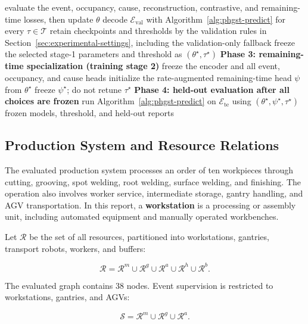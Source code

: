 \begin{algorithm}[p]
{{{evaluate the event, occupancy, cause, reconstruction, contrastive, and remaining-time losses, then update $\theta$\;
    }
decode $\mathcal{E}_{\mathrm{val}}$ with Algorithm~\ref{alg:phgst-predict} for every $\tau\in\mathcal{T}$\;
retain checkpoints and thresholds by the validation rules in Section~\ref{sec:experimental-settings}, including the validation-only fallback\;
  }
}
freeze the selected stage-1 parameters and threshold as $(\theta^{\star},\tau^{\star})$ 
\BlankLine
\textbf{Phase 3: remaining-time specialization (training stage 2)}\;
freeze the encoder and all event, occupancy, and cause heads\;
initialize the rate-augmented remaining-time head $\psi$ from $\theta^{\star}$\;
freeze $\psi^{\star}$; do not retune $\tau^{\star}$\;
\BlankLine
\textbf{Phase 4: held-out evaluation after all choices are frozen}\;
run Algorithm~\ref{alg:phgst-predict} on $\mathcal{E}_{\mathrm{te}}$ using $(\theta^{\star},\psi^{\star},\tau^{\star})$\;
\Return frozen models, threshold, and held-out reports 
\end{algorithm}
\FloatBarrier

\subsection{Production System and Resource Relations}\label{production-system-and-resource-relations}

The evaluated production system processes an order of ten workpieces through cutting, grooving, spot welding, root welding, surface welding, and finishing. The operation also involves worker service, intermediate storage, gantry handling, and AGV transportation. In this report, a \textbf{workstation} is a processing or assembly unit, including automated equipment and manually operated workbenches.

Let \(\mathcal{R}\) be the set of all resources, partitioned into workstations, gantries, transport robots, workers, and buffers:

\[
\mathcal{R}=\mathcal{R}^{m}\cup\mathcal{R}^{g}\cup\mathcal{R}^{a}\cup\mathcal{R}^{h}\cup\mathcal{R}^{b}.
\]

The evaluated graph contains 38 nodes. Event supervision is restricted to workstations, gantries, and AGVs:

\[
\mathcal{S}=\mathcal{R}^{m}\cup\mathcal{R}^{g}\cup\mathcal{R}^{a}.
\]

